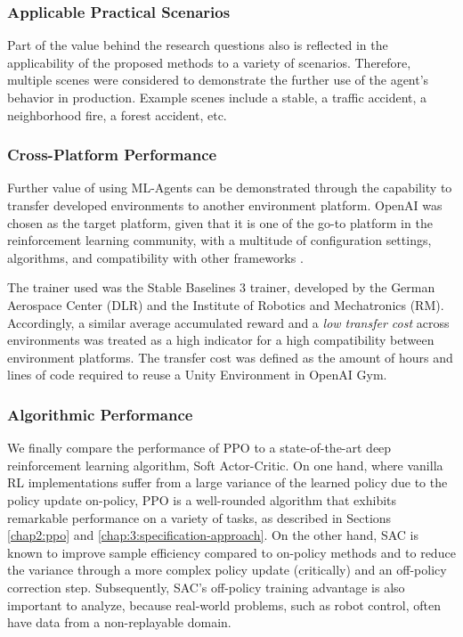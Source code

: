 \subsubsection{Applicable Practical Scenarios}\label{chap:3:further-generalization}
Part of the value behind the research questions also is reflected in the applicability of the proposed methods to a variety of scenarios. 
Therefore, multiple scenes were considered to demonstrate the further use of the agent's behavior in production. Example scenes include a stable, a traffic accident, a neighborhood fire, a forest accident, etc.

\subsubsection{Cross-Platform Performance}\label{chap:3:further-generalization}
Further value of using ML-Agents can be demonstrated through the capability to transfer developed environments to another environment platform. OpenAI \cite{github-openai-gym} was chosen as the target platform, given that it is one of the go-to platform in the reinforcement learning community, with a multitude of configuration settings, algorithms, and compatibility with other frameworks \cite{github-openai-gym}.

The trainer used was the Stable Baselines 3 \cite{github-dlr-rm-baselines3} trainer, developed by the German Aerospace Center (DLR) and the Institute of Robotics and Mechatronics (RM). Accordingly, a similar average accumulated reward and a \textit{low transfer cost} across environments was treated as a high indicator for a high compatibility between environment platforms.  The transfer cost was defined as the amount of hours and lines of code required to reuse a Unity Environment in OpenAI Gym.

\subsubsection{Algorithmic Performance} \label{chap:3:algorithmic-performance}
We finally compare the performance of PPO to a state-of-the-art deep reinforcement learning algorithm, Soft Actor-Critic. 
On one hand, where vanilla RL implementations suffer from a large variance of the learned policy due to the policy update on-policy, PPO is a well-rounded algorithm that exhibits remarkable performance on a variety of tasks, as described in Sections \ref{chap2:ppo} and \ref{chap:3:specification-approach}. On the other hand, SAC is known to improve sample efficiency compared to on-policy methods and to reduce the variance through a more complex policy update (critically) and an off-policy correction step. Subsequently, SAC's off-policy training advantage is also important to analyze, because real-world problems, such as robot control, often have data from a non-replayable domain. 




